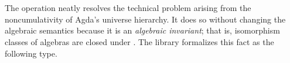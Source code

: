 \begin{code}
\AgdaSpace{}%
\AgdaSpace{}%
\AgdaSpace{}%
\AgdaSymbol{(}\AgdaSpace{}%
\AgdaSpace{}%
\AgdaSpace{}%
\AgdaSpace{}%
\AgdaSymbol{)}\AgdaSpace{}%
\AgdaSpace{}%
\<%
\\
%
\>[2]\AgdaSpace{}%
\AgdaSpace{}%
\AgdaSymbol{=}\AgdaSpace{}%
\AgdaSpace{}%
\AgdaSymbol{(}\AgdaSpace{}%
\AgdaSpace{}%
\AgdaSpace{}%
\AgdaSpace{}%
\AgdaSpace{}%
\AgdaSymbol{(}\AgdaSpace{}%
\AgdaSpace{}%
\AgdaSymbol{(}\AgdaSpace{}%
\AgdaSpace{}%
\AgdaSpace{}%
\AgdaSpace{}%
\AgdaSpace{}%
\AgdaSymbol{)))}\AgdaSpace{}%
\AgdaSymbol{(}\AgdaSpace{}%
\AgdaSpace{}%
\AgdaSymbol{)}\<%
\\
\>[0]\<%
\end{code}
\fi

The  operation neatly resolves the technical problem arising from the noncumulativity of Agda's
universe hierarchy. It does so without changing the algebraic semantics because it is an
\emph{algebraic invariant}; that is, isomorphism classes of algebras are closed under
.
\ifshort
The \agdaalgebras library formalizes this fact as the following type.

\else

